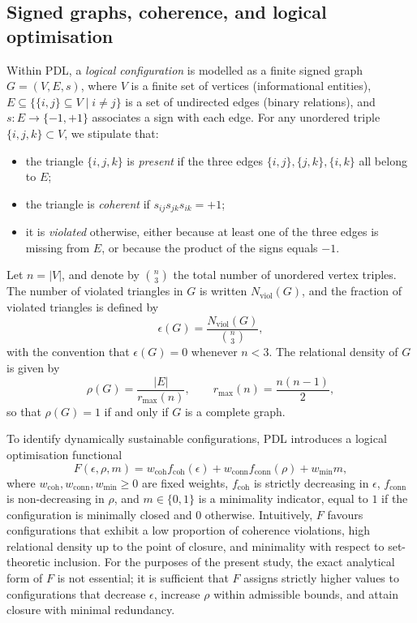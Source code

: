 \documentclass[11pt,a4paper]{article}
\begin{document}
\subsection{Signed graphs, coherence, and logical optimisation}

Within PDL, a \emph{logical configuration} is modelled as a finite signed graph $G = (V,E,s)$, where $V$ is a finite set of vertices (informational entities), $E \subseteq \{\{i,j\} \subseteq V \mid i\neq j\}$ is a set of undirected edges (binary relations), and $s : E \to \{-1,+1\}$ associates a sign with each edge.\cite{Laubscher2026IntroPDL,Laubscher2026PDL_English} For any unordered triple $\{i,j,k\}\subset V$, we stipulate that:
\begin{itemize}
\item the triangle $\{i,j,k\}$ is \emph{present} if the three edges $\{i,j\},\{j,k\},\{i,k\}$ all belong to $E$;
\item the triangle is \emph{coherent} if $s_{ij}s_{jk}s_{ik}=+1$;
\item it is \emph{violated} otherwise, either because at least one of the three edges is missing from $E$, or because the product of the signs equals $-1$.
\end{itemize}
Let $n = |V|$, and denote by $\binom{n}{3}$ the total number of unordered vertex triples. The number of violated triangles in $G$ is written $N_{\mathrm{viol}}(G)$, and the fraction of violated triangles is defined by
\begin{equation}
\epsilon(G) = \frac{N_{\mathrm{viol}}(G)}{\binom{n}{3}},
\end{equation}
with the convention that $\epsilon(G)=0$ whenever $n<3$. The relational density of $G$ is given by
\begin{equation}
\rho(G) = \frac{|E|}{r_{\max}(n)}, \qquad r_{\max}(n) = \frac{n(n-1)}{2},
\end{equation}
so that $\rho(G)=1$ if and only if $G$ is a complete graph.\par To identify dynamically sustainable configurations, PDL introduces a logical optimisation functional
\begin{equation}
F(\epsilon,\rho,m) = w_{\mathrm{coh}} f_{\mathrm{coh}}(\epsilon) + w_{\mathrm{conn}} f_{\mathrm{conn}}(\rho) + w_{\mathrm{min}} m,
\label{eq:Ffunctional}
\end{equation}
where $w_{\mathrm{coh}},w_{\mathrm{conn}},w_{\mathrm{min}}\geq 0$ are fixed weights, $f_{\mathrm{coh}}$ is strictly decreasing in $\epsilon$, $f_{\mathrm{conn}}$ is non-decreasing in $\rho$, and $m\in\{0,1\}$ is a minimality indicator, equal to $1$ if the configuration is minimally closed and $0$ otherwise.\cite{Laubscher2026IntroPDL,Laubscher2026PDL_English} Intuitively, $F$ favours configurations that exhibit a low proportion of coherence violations, high relational density up to the point of closure, and minimality with respect to set-theoretic inclusion. For the purposes of the present study, the exact analytical form of $F$ is not essential; it is sufficient that $F$ assigns strictly higher values to configurations that decrease $\epsilon$, increase $\rho$ within admissible bounds, and attain closure with minimal redundancy.
\end{document}
